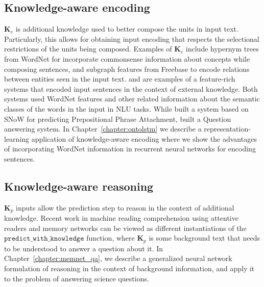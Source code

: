 \subsection{Knowledge-aware encoding}
$\mathbf{K}_e$ is additional knowledge used to better compose the units in input text. Particularly, this allows for
obtaining input encoding that respects the selectional restrictions of the units being composed.
Examples of $\mathbf{K}_e$ include hypernym trees from WordNet for
incorporate commonsense information about concepts while composing sentences, and subgraph features from Freebase to encode relations
between entities seen in the input text. \cite{moldovan2001logic} and \cite{krymolowski1998incorporating} are examples of a feature-rich systems that encoded input sentences in the 
context of external knowledge. Both systems used WordNet features and other related information about the semantic classes of the words in the input in NLU tasks. While \cite{krymolowski1998incorporating} 
built a system based on SNoW \cite{CCRR99} for predicting Prepositional Phrase Attachment, \cite{moldovan2001logic} built a Question answering system. In Chapter~\ref{chapter:ontolstm} we describe
a representation-learning application of knowledge-aware encoding where we show the advantages of incorporating WordNet information in recurrent neural networks for encoding sentences.

\subsection{Knowledge-aware reasoning}
$\textbf{K}_p$ inputs allow the prediction step to reason in the context of additional knowledge. Recent work in machine reading comprehension using 
attentive readers \cite{hermann2015teaching} and memory networks \cite{weston2014memory,Sukhbaatar2015EndToEndMN,Xiong2016DynamicMN} can be viewed as different instantiations
of the $\mathtt{predict\_with\_knowledge}$ function, where $\textbf{K}_p$ is some background text that needs to be understood to answer a question about it. 
In Chapter~\ref{chapter:memnet_qa}, we describe a generalized neural network formulation of reasoning in the context of background information,
and apply it to the problem of answering science questions.

